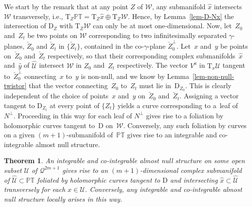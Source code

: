 \documentclass[10pt,a4paper]{amsart}
\numberwithin{equation}{section}
\newtheorem{Theorem}{Theorem}[section]
\newcommand{\mc} [1]{\mathcal{#1}}
\newcommand{\Drm} {{\mathrm{D}}}
\newcommand{\Tgt} {\mathrm{T}}
\newcommand{\PT} {\mathbb{PT}}
\begin{document}
We start by the remark that at any point $Z$ of $\mc{W}$, any submanifold $\hat{x}$ intersects $\mc{W}$ transversely, i.e., $\Tgt_Z \PT = \Tgt_Z \hat{x} \oplus \Tgt_Z \mc{W}$. Hence, by Lemma~\ref{lem-D-Nx} the intersection of $\Drm_Z$ with $\Tgt_Z \mc{W}$ can only be at most one-dimensional. Now, let~$Z_0$ and~$Z_t$ be two points on $\mc{W}$ corresponding to two inf\/initesimally separated $\gamma$-planes, $\check{Z}_0$ and $\check{Z}_t$ in $\{ \check{Z}_t \}$, contained in the co-$\gamma$-plane $\check{Z}^\perp_0$. Let~$x$ and~$y$ be points on~$\check{Z}_0$ and~$\check{Z}_t$ respectively, so that their corresponding complex subma\-ni\-folds~$\hat{x}$ and~$\hat{y}$ of $\widehat{\mc{U}}$ intersect $\mc{W}$ in $Z_0$ and~$Z_t$ respectively. The vector $V^a$ in $\Tgt_x \mc{U}$ tangent to~$\check{Z}^\perp_0$ connecting~$x$ to~$y$ is non-null, and we know by Lemma~\ref{lem-non-null-twistor} that the vector connecting~$Z_0$ to~$Z_t$ must lie in~$\mathrm{D}_{Z_0}$. This is clearly independent of the choice of points~$x$ and~$y$ on~$\check{Z}_0$ and~$\check{Z}_t$. Assigning a vector tangent to $\Drm_{Z_t}$ at every point of $\{ Z_t \}$ yields a curve corresponding to a~leaf of~$N^\perp$. Proceeding in this way for each leaf of $N^\perp$ gives rise to a foliation by holomorphic curves tangent to~$\Drm$ on~$\mc{W}$. Conversely, any such foliation by curves on a given $(m+1)$-submanifold of~$\PT$ gives rise to an integrable and co-integrable almost null structure.

\begin{Theorem}\label{thm-odd-Kerr-theorem-II}
An integrable and co-integrable almost null structure on some open subset $\mc{U}$ of $\mc{Q}^{2m+1}$ gives rise to an $(m+1)$-dimensional complex submanifold of $\widehat{\mc{U}} \subset \PT$ foliated by holomorphic curves tangent to $\mathrm{D}$ and intersecting $\hat{x} \subset \widehat{\mc{U}}$ transversely for each $x \in \mc{U}$. Conversely, any integrable and co-integrable almost null structure locally arises in this way.
\end{Theorem}
\end{document}
